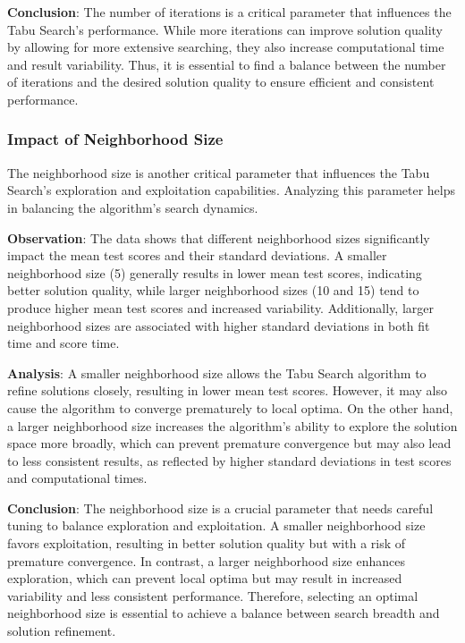 \documentclass{article}
\begin{document}
    \textbf{Conclusion}: The number of iterations is a critical parameter that influences the Tabu Search's performance. While more iterations can improve solution quality by allowing for more extensive searching, they also increase computational time and result variability. Thus, it is essential to find a balance between the number of iterations and the desired solution quality to ensure efficient and consistent performance.

    \subsubsection{Impact of Neighborhood Size}

    The neighborhood size is another critical parameter that influences the Tabu Search’s exploration and exploitation capabilities. Analyzing this parameter helps in balancing the algorithm’s search dynamics.

    \textbf{Observation}: The data shows that different neighborhood sizes significantly impact the mean test scores and their standard deviations. A smaller neighborhood size (5) generally results in lower mean test scores, indicating better solution quality, while larger neighborhood sizes (10 and 15) tend to produce higher mean test scores and increased variability. Additionally, larger neighborhood sizes are associated with higher standard deviations in both fit time and score time.

    \textbf{Analysis}: A smaller neighborhood size allows the Tabu Search algorithm to refine solutions closely, resulting in lower mean test scores. However, it may also cause the algorithm to converge prematurely to local optima. On the other hand, a larger neighborhood size increases the algorithm's ability to explore the solution space more broadly, which can prevent premature convergence but may also lead to less consistent results, as reflected by higher standard deviations in test scores and computational times.

    \textbf{Conclusion}: The neighborhood size is a crucial parameter that needs careful tuning to balance exploration and exploitation. A smaller neighborhood size favors exploitation, resulting in better solution quality but with a risk of premature convergence. In contrast, a larger neighborhood size enhances exploration, which can prevent local optima but may result in increased variability and less consistent performance. Therefore, selecting an optimal neighborhood size is essential to achieve a balance between search breadth and solution refinement.
\end{document}
